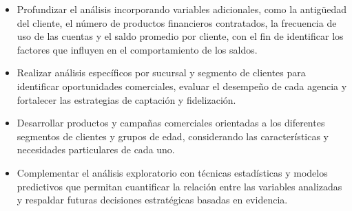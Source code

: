 \begin{itemize}
    \item Profundizar el análisis incorporando variables adicionales, como la antigüedad del cliente, el número de productos financieros contratados, la frecuencia de uso de las cuentas y el saldo promedio por cliente, con el fin de identificar los factores que influyen en el comportamiento de los saldos.
    \item Realizar análisis específicos por sucursal y segmento de clientes para identificar oportunidades comerciales, evaluar el desempeño de cada agencia y fortalecer las estrategias de captación y fidelización.
    \item Desarrollar productos y campañas comerciales orientadas a los diferentes segmentos de clientes y grupos de edad, considerando las características y necesidades particulares de cada uno.
    \item Complementar el análisis exploratorio con técnicas estadísticas y modelos predictivos que permitan cuantificar la relación entre las variables analizadas y respaldar futuras decisiones estratégicas basadas en evidencia.
\end{itemize}
